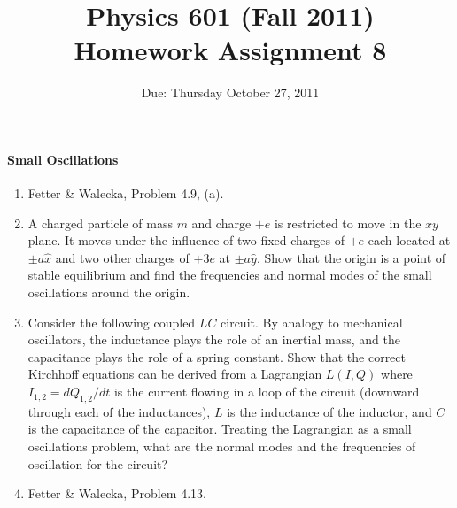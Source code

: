 \documentclass[letterpaper,11pt]{article}
\title{Physics 601 (Fall 2011) \\ Homework Assignment 8}
\date{Due: Thursday October 27, 2011}
\begin{document}
\maketitle

\paragraph*{Small Oscillations}
\begin{enumerate}
 \item Fetter \& Walecka, Problem 4.9, (a).
 \item A charged particle of mass $m$ and charge $+e$ is restricted to move in the $xy$ plane.  It moves under the influence of two fixed charges of $+e$ each located at $\pm a \hat{x}$ and two other charges of $+3e$ at $\pm a \hat{y}$.  Show that the origin is a point of stable equilibrium and find the frequencies and normal modes of the small oscillations around the origin.
 \item Consider the following coupled $LC$ circuit.  By analogy to mechanical oscillators, the inductance plays the role of an inertial mass, and the capacitance plays the role of a spring constant.  Show that the correct Kirchhoff equations can be derived from a Lagrangian $L(I,Q)$ where $I_{1,2} = dQ_{1,2}/dt$ is the current flowing in a loop of the circuit (downward through each of the inductances), $L$ is the inductance of the inductor, and $C$ is the capacitance of the capacitor.  Treating the Lagrangian as a small oscillations problem, what are the normal modes and the frequencies of oscillation for the circuit?
 \begin{center}
 \end{center}
 \item Fetter \& Walecka, Problem 4.13.
\end{enumerate}
\end{document}
